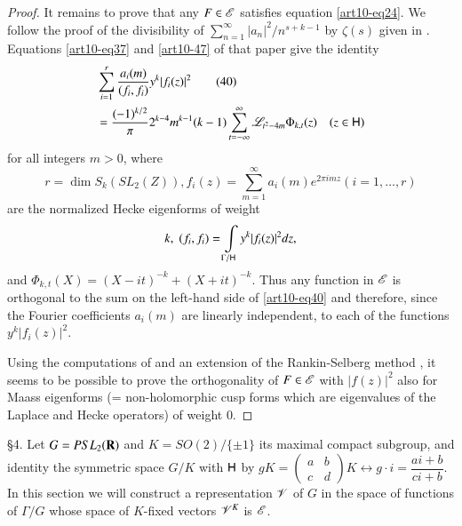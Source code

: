 \begin{proof}
It remains to prove that any $F \in \mathscr{E}$ satisfies equation \eqref{art10-eq24}. We follow the proof of the divisibility of $\sum\limits^\infty_{n=1} |a_n|^2 / n^{s+k-1}$ by $\zeta(s)$ given in \cite{art10-11}. Equations \eqref{art10-eq37} and \eqref{art10-47} of that paper give the identity
\begin{align*}
&\sum\limits^r_{i=1} \frac{a_i(m)}{(f_i, f_i)} y^k |f_i (z)|^2 \tag{40} \label{art10-40}\\
& =\frac{(-1)^{k/2}}{\pi} 2^{k-4} m^{k-1} (k-1) \sum\limits^\infty_{t = - \infty} \mathscr{L}_{t^2 - 4 m} \Phi_{k,t} (z) \quad (z \in \mathsf{H})
\end{align*}
for all integers $m > 0$, where 
$$
r = \dim S_k (SL_2 (Z)), f_i(z)  =\sum\limits^\infty_{m=1} a_i (m) e^{2 \pi i m z} (i = 1, \ldots, r)
$$ 
are the normalized Hecke eigenforms of weight 
$$
k,\;(f_i, f_i) = \int\limits_{\Gamma / \mathsf{H}} y^k |f_i(z)|^2 dz,
$$ 
and $\Phi_{k,t} (X) = (X - it)^{-k} + (X + it)^{-k}$. Thus any function in $\mathscr{E}$ is orthogonal to the sum on the left-hand side of \eqref{art10-eq40} and therefore, since the Fourier coefficients $a_i(m)$ are linearly independent, to each of the functions $y^k |f_i(z)|^2$.

Using the computations of \cite{art10-12} and an extension of the Rankin-Selberg method \cite{art10-13} , it seems to be possible to prove the orthogonality of $F \in \mathscr{E}$ with $|f(z)|^2$ also for Maass eigenforms (= non-holomorphic cusp forms which are eigenvalues of the Laplace and Hecke operators) of weight 0.
\end{proof}

\S 4. Let $G = PSL_2 (\mathbf{R})$ and $K = SO (2) / \{\pm 1\}$ its maximal compact subgroup, and identity the symmetric space $G/ K$ with $\mathsf{H}$ by $gK = \left(\begin{matrix}
a & b \\
 c & d
\end{matrix}\right)K \leftrightarrow g \cdot i = \dfrac{ai + b}{ci+b}$. In this section we will construct a representation $\mathscr{V}$ of $G$ in the space of functions of $\Gamma / G$ whose space of $K$-fixed vectors $\mathscr{V}^K$ is $\mathscr{E}$.

